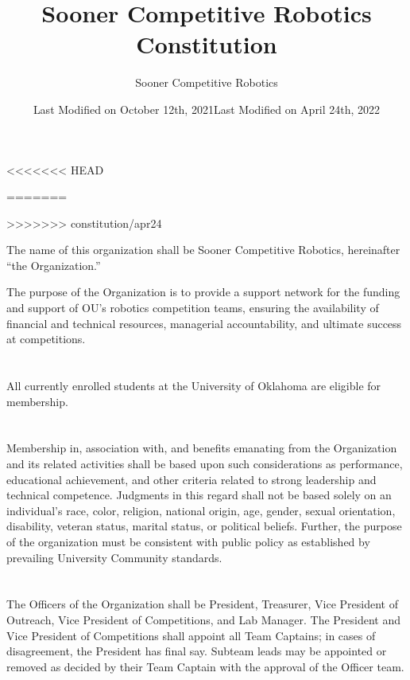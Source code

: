 \documentclass[12pt]{cls/constitution}
\begin{document}
\title{Sooner Competitive Robotics Constitution}
\author{Sooner Competitive Robotics}
<<<<<<< HEAD
\date{Last Modified on October 12th, 2021}
=======
\date{Last Modified on April 24th, 2022}
>>>>>>> constitution/apr24
\maketitle
\setcounter{tocdepth}{0}
\tableofcontents
\newpage


The name of this organization shall be Sooner Competitive Robotics, hereinafter “the Organization.”


The purpose of the Organization is to provide a support network for the funding and support of OU's robotics competition teams, ensuring the availability of financial and technical resources, managerial accountability, and ultimate success at competitions.


\section{}
All currently enrolled students at the University of Oklahoma are eligible for membership. 

\section{}
Membership in, association with, and benefits emanating from the Organization and its related activities shall be based upon such considerations as performance, educational achievement, and other criteria related to strong leadership and technical competence. Judgments in this regard shall not be based solely on an individual’s race, color, religion, national origin, age, gender, sexual orientation, disability, veteran status, marital status, or political beliefs. Further, the purpose of the organization must be consistent with public policy as established by prevailing University Community standards.  


\section{}
The Officers of the Organization shall be President, Treasurer, Vice President of Outreach, Vice President of Competitions, and Lab Manager.
The President and Vice President of Competitions shall appoint all Team Captains; in cases of disagreement, the President has final say.
Subteam leads may be appointed or removed as decided by their Team Captain with the approval of the Officer team.
\end{document}
